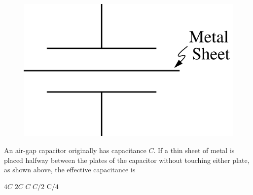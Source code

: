 \begin{figure}[H]
    \center
    \includegraphics[scale=0.25]{images/img-012-023.png}
\end{figure}

\begin{questions}\setcounter{question}{32}\question
An air-gap capacitor originally has capacitance $C$. If a thin sheet of metal is placed halfway between the plates of the capacitor without touching either plate, as shown above, the effective capacitance is

\begin{choices}
\choice $4 C$
\choice $2 C$
\choice $C$
\choice $C / 2$
\choice $\mathrm{C} / 4$
\end{choices}\end{questions}

